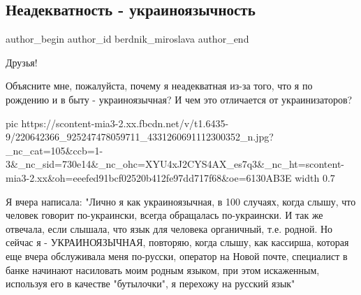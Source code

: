  
 
 
 
 
 
\subsection{Неадекватность - украиноязычность}
\label{sec:27_07_2021.fb.berdnik_miroslava.3.neadekvat_mova}
 
\ifcmt
 author_begin
   author_id berdnik_miroslava
 author_end
\fi

Друзья!

Объясните мне, пожалуйста, почему я неадекватная из-за того, что я по рождению
и в быту - украиноязычная?  И чем это отличается от украинизаторов?

\ifcmt
  pic https://scontent-mia3-2.xx.fbcdn.net/v/t1.6435-9/220642366_925247478059711_4331260691112300352_n.jpg?_nc_cat=105&ccb=1-3&_nc_sid=730e14&_nc_ohc=XYU4xJ2CYS4AX_es7q3&_nc_ht=scontent-mia3-2.xx&oh=eeefed91bcf02520b412fe97dd717f68&oe=6130AB3E
  width 0.7
\fi

Я вчера написала: "Лично я как украиноязычная, в 100 случаях, когда слышу, что
человек говорит по-украински, всегда обращалась по-украински. И так же
отвечала, если слышала, что язык для человека органичный, т.е. родной.  Но
сейчас я - УКРАИНОЯЗЫЧНАЯ, повторяю, когда слышу, как кассирша, которая еще
вчера обслуживала меня по-русски, оператор на Новой почте, специалист в банке
начинают насиловать моим  родным языком, при этом искаженным, используя его в
качестве "бутылочки", я перехожу на русский язык"

